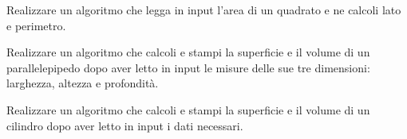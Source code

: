 \begin{exercise}
	Realizzare un algoritmo che legga in input l'area di un quadrato e ne calcoli lato e perimetro.
\end{exercise}

\begin{exercise}
	Realizzare un algoritmo che calcoli e stampi la superficie e il volume di un parallelepipedo dopo aver letto in input le misure delle sue tre dimensioni: larghezza, altezza e profondità.
\end{exercise}

\begin{exercise}
	Realizzare un algoritmo che calcoli e stampi la superficie e il volume di un cilindro dopo aver letto in input i dati necessari.
\end{exercise}

